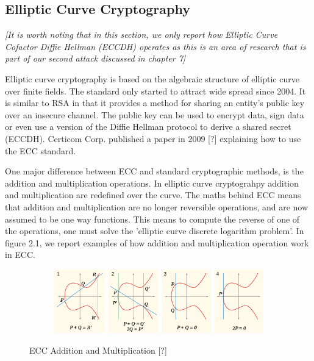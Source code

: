 \documentclass[bsc,frontabs,twoside,singlespacing,parskip,deptreport]{infthesis}     %
\begin{document}
\subsection{Elliptic Curve Cryptography}
\textit{[It is worth noting that in this section, we only report how Elliptic Curve Cofactor Diffie Hellman (ECCDH) operates as this is an area of research that is part of our second attack discussed in chapter 7]}

Elliptic curve cryptography is based on the algebraic structure of elliptic curve over finite fields. The standard only started to attract wide spread since 2004. It is similar to RSA in that it provides a method for sharing an entity's public key over an insecure channel. The public key can be used to encrypt data, sign data or even use a version of the Diffie Hellman protocol to derive a shared secret (ECCDH). Certicom Corp. published a paper in 2009 [?] explaining how to use the ECC standard.

One major difference between ECC and standard cryptographic methods, is the addition and multiplication operations. In elliptic curve cryptograhpy addition and multiplication are redefined over the curve. The maths behind ECC means that addition and multiplication are no longer reversible operations, and are now assumed to be one way functions. This means to compute the reverse of one of the operations, one must solve the 'elliptic curve discrete logarithm problem'. In figure 2.1, we report examples of how addition and multiplication operation work in ECC.
\begin{figure}[H]
\centering
\begin{subfigure}{1.2\textwidth}
  \includegraphics[width=1\linewidth]
  {images/crypto/ecc.png}
\end{subfigure}
\caption{ECC Addition and Multiplication [?]}
\end{figure}
\end{document}
